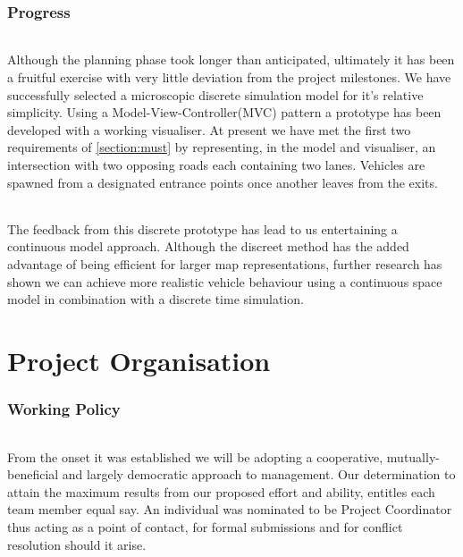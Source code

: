 \documentclass[11pt,a4paper]{article}
\begin{document}
\section{Progress}
\paragraph{}
Although the planning phase took longer than anticipated, ultimately it has been a fruitful exercise with very little deviation from the project milestones.  We have successfully selected a microscopic discrete simulation model for it's relative simplicity.  Using a Model-View-Controller(MVC) pattern a prototype has been developed with a working visualiser.  At present we have met the first two requirements of \ref{section:must} by representing, in the model and visualiser, an intersection with two opposing roads each containing two lanes.  Vehicles are spawned from a designated entrance points once another leaves from the exits.    
\paragraph{}
The feedback from this discrete prototype has lead to us entertaining a continuous model approach.  Although the discreet method has the added advantage of being efficient for larger map representations, further research has shown we can achieve more realistic vehicle behaviour using a continuous space model in combination with a discrete time simulation.

\pagebreak

\part{Project Organisation}

\section{Working Policy}
\paragraph{}
From the onset it was established we will be adopting a cooperative, mutually-beneficial and largely democratic approach to management.  Our determination to attain the maximum results from our proposed effort and ability, entitles each team member equal say.  An individual was nominated to be Project Coordinator thus acting as a point of contact, for formal submissions and for conflict resolution should it arise.
\end{document}
